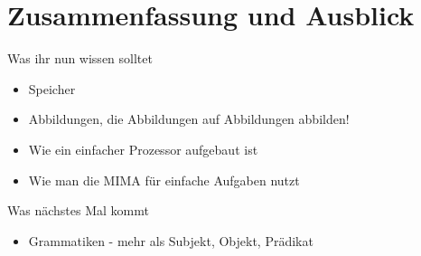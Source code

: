 


%








% 

\appendix
\beginbackup

\section{Zusammenfassung und Ausblick}

\begin{frame}
	\begin{block}{Was ihr nun wissen solltet}
		\begin{itemize}
			\item Speicher
			\item Abbildungen, die Abbildungen auf Abbildungen abbilden!
			\item Wie ein einfacher Prozessor aufgebaut ist
			\item Wie man die MIMA für einfache Aufgaben nutzt
		\end{itemize}
	\end{block}

	\begin{block}{Was nächstes Mal kommt}
		\begin{itemize}
			\item Grammatiken - mehr als Subjekt, Objekt, Prädikat
		\end{itemize}
	\end{block}
\end{frame}




\backupend

